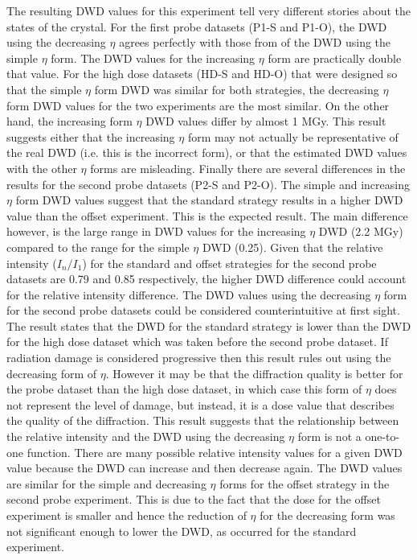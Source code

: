 The resulting DWD values for this experiment tell very different stories about the states of the crystal.
For the first probe datasets (P1-S and P1-O), the DWD using the decreasing $\eta$ agrees perfectly with those from of the DWD using the simple $\eta$ form.
The DWD values for the increasing $\eta$ form are practically double that value.
For the high dose datasets (HD-S and HD-O) that were designed so that the simple $\eta$ form DWD was similar for both strategies, the decreasing $\eta$ form DWD values for the two experiments are the most similar.
On the other hand, the increasing form $\eta$ DWD values differ by almost 1 MGy.
This result suggests either that the increasing $\eta$ form may not actually be representative of the real DWD (i.e. this is the incorrect form), or that the estimated DWD values with the other $\eta$ forms are misleading.
Finally there are several differences in the results for the second probe datasets (P2-S and P2-O).
The simple and increasing $\eta$ form DWD values suggest that the standard strategy results in a higher DWD value than the offset experiment.
This is the expected result.
The main difference however, is the large range in DWD values for the increasing $\eta$ DWD (2.2 MGy) compared to the range for the simple $\eta$ DWD (0.25).
Given that the relative intensity ($I_{n}/I_{1}$) for the standard and offset strategies for the second probe datasets are 0.79 and 0.85 respectively, the higher DWD difference could account for the relative intensity difference.
The DWD values using the decreasing $\eta$ form for the second probe datasets could be considered counterintuitive at first sight.
The result states that the DWD for the standard strategy is lower than the DWD for the high dose dataset which was taken before the second probe dataset.
If radiation damage is considered progressive then this result rules out using the decreasing form of $\eta$.
However it may be that the diffraction quality is better for the probe dataset than the high dose dataset, in which case this form of $\eta$ does not represent the level of damage, but instead, it is a dose value that describes the quality of the diffraction.
This result suggests that the relationship between the relative intensity and the DWD using the decreasing $\eta$ form is not a one-to-one function.
There are many possible relative intensity values for a given DWD value because the DWD can increase and then decrease again.
The DWD values are similar for the simple and decreasing $\eta$ forms for the offset strategy in the second probe experiment.
This is due to the fact that the dose for the offset experiment is smaller and hence the reduction of $\eta$ for the decreasing form was not significant enough to lower the DWD, as occurred for the standard experiment.
